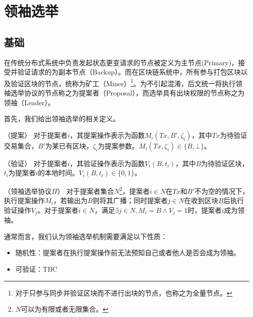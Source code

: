 \section{领袖选举}
\label{sec:leader_election}
\subsection{基础}
在传统分布式系统\cite{lamport2001paxos,castro1999practical}中负责发起状态更变请求的节点被定义为主节点(Primary)，接受并验证请求的为副本节点（Backup）。而在区块链系统中，所有参与打包区块以及验证区块的节点，统称为矿工（Miner）\footnote{对于只参与同步并验证区块而不进行出块的节点，也称之为全量节点。}。为不引起混淆，后文统一将执行领袖选举协议的节点称之为提案者（Proposal），而选举具有出块权限的节点称之为领袖（Leader）。

首先，我们给出领袖选举的相关定义。
\begin{definition}
（提案） 对于提案者$i$，其提案操作表示为函数$M_i(Tx,B',\zeta_i)$，其中$Tx$为待验证交易集合，$B'$为某已有区块，$\zeta_i$为提案参数。$M_i(Tx,\zeta_i)\in\{B,\bot\}$。
\end{definition}


\begin{definition}
（验证） 对于提案者$i$，其验证操作表示为函数$V_i(B,t_i)$，其中$B$为待验证区块，$t_i$为提案者$i$的本地时间。$V_i(B,t_i)\in\{0,1\}$。
\end{definition}

\begin{definition}
\label{def:leader_election}
（领袖选举协议$\Pi$） 对于提案者集合$N$\footnote{$N$可以为有限或者无限集合。}，提案者$i\in N$在$Tx$和$B'$不为空的情况下，执行提案操作$M_i$，若输出为$B$则将其广播；同时提案者$j \in N$在收到区块$B$后执行验证操作$V_j$。对于提案者$i\in N$，满足$\exists j\in N,M_i=B\wedge V_j=1$时，提案者$i$成为领袖。

\end{definition}



通常而言，我们认为领袖选举机制需要满足以下性质：

\begin{itemize}
  \item 随机性：提案者在执行提案操作前无法预知自己或者他人是否会成为领袖。
  \item 可验证：TBC%
\end{itemize}

